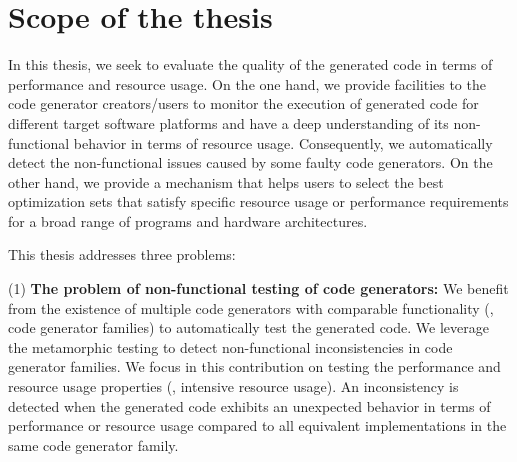 



\section{Scope of the thesis}

In this thesis, we seek to evaluate the quality of the generated code in terms of performance and resource usage.
On the one hand, we provide facilities to the code generator creators/users to monitor the execution of generated code for different target software platforms and have a deep understanding of its non-functional behavior in terms of resource usage. Consequently, we automatically detect the non-functional issues caused by some faulty code generators. 
On the other hand, we provide a mechanism that helps users to select the best optimization sets that satisfy specific resource usage or performance requirements for a broad range of programs and hardware architectures.

This thesis addresses three problems: 
	
	(1) \textbf{The problem of non-functional testing of code generators:} We benefit from the existence of multiple code generators with comparable functionality (\ie, code generator families) to automatically test the generated code. We leverage the metamorphic testing\cite{chen1998metamorphic} to detect non-functional inconsistencies in code generator families.
	We focus in this contribution on testing the performance and resource usage properties (\eg, intensive resource usage).
	An inconsistency is detected when the generated code exhibits an unexpected behavior in terms of performance or resource usage compared to all equivalent implementations in the same code generator family.
	
